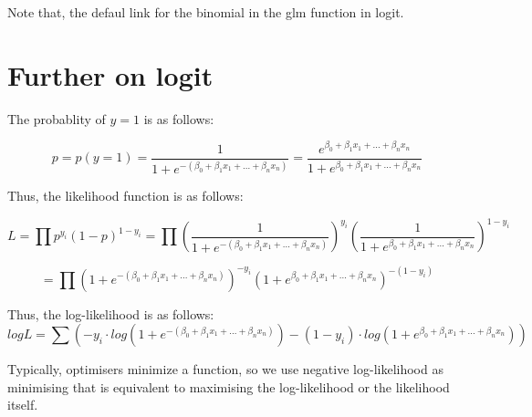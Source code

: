 \documentclass[]{book}
\begin{document}
Note that, the defaul link for the binomial in the glm function in
logit.

\section{Further on logit}\label{further-on-logit}

The probablity of \(y=1\) is as follows:

\[p=p(y=1)=\frac{1}{1+e^{-(\beta_0+\beta_1x_1+...+\beta_nx_n)}}=\frac{e^{\beta_0+\beta_1x_1+...+\beta_nx_n}}{1+e^{\beta_0+\beta_1x_1+...+\beta_nx_n}}\]

Thus, the likelihood function is as follows:

\[L=\prod p^{y_i}(1-p)^{1-y_i}=\prod (\frac{1}{1+e^{-(\beta_0+\beta_1x_1+...+\beta_nx_n)}})^{y_i}(\frac{1}{1+e^{\beta_0+\beta_1x_1+...+\beta_nx_n}})^{1-y_i}\]

\[=\prod (1+e^{-(\beta_0+\beta_1x_1+...+\beta_nx_n)})^{-y_i}(1+e^{\beta_0+\beta_1x_1+...+\beta_nx_n})^{-(1-y_i)}\]

Thus, the log-likelihood is as follows:
\[logL=\sum (-y_i \cdot log(1+e^{-(\beta_0+\beta_1x_1+...+\beta_nx_n)})-(1-y_i)\cdot log(1+e^{\beta_0+\beta_1x_1+...+\beta_nx_n}))\]

Typically, optimisers minimize a function, so we use negative
log-likelihood as minimising that is equivalent to maximising the
log-likelihood or the likelihood itself.
\end{document}
